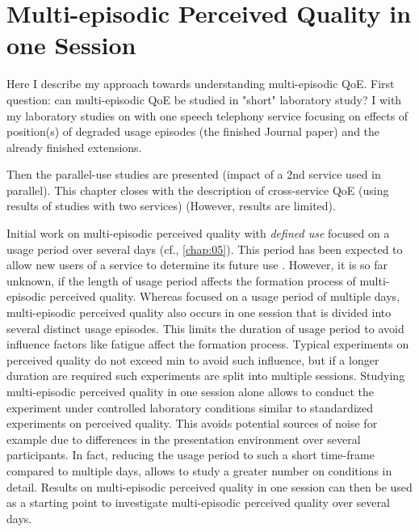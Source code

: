 \chapter{Multi-episodic Perceived Quality in one Session}\label{chap:06}
\begin{chapter-abstract}
Here I describe my approach towards understanding multi-episodic QoE.
First question: can multi-episodic QoE be studied in "short" laboratory study?
I with my laboratory studies on with one speech telephony service focusing on effects of position(s) of degraded usage episodes (the finished Journal paper) and the already finished extensions.

Then the parallel-use studies are presented (impact of a 2nd service used in parallel).
This chapter closes with the description of cross-service QoE (using results of studies with two services) (However, results are limited).
\end{chapter-abstract}

Initial work on multi-episodic perceived quality with \emph{defined use} focused on a usage period over several days (cf., \autoref{chap:05}). 
This period has been expected to allow new users of a service to determine its future use \citep[cf.,][]{moller_single-call_2011}.
However, it is so far unknown, if the length of usage period affects the formation process of multi-episodic perceived quality.
Whereas \cite{moller_single-call_2011} focused on a usage period of multiple days, multi-episodic perceived quality also occurs in one session that is divided into several distinct usage episodes.
This limits the duration of usage period to avoid influence factors like fatigue affect the formation process.
Typical experiments on perceived quality do not exceed \unit[90]{min} to avoid such influence, but if a longer duration are required such experiments are split into multiple sessions.
Studying multi-episodic perceived quality in one session alone allows to conduct the experiment under controlled laboratory conditions similar to standardized experiments on perceived quality.
This avoids potential sources of noise for example due to differences in the presentation environment over several participants.
In fact, reducing the usage period to such a short time-frame compared to multiple days, allows to study a greater number on conditions in detail.
Results on multi-episodic perceived quality in one session can then be used as a starting point to investigate multi-episodic perceived quality over several days.



